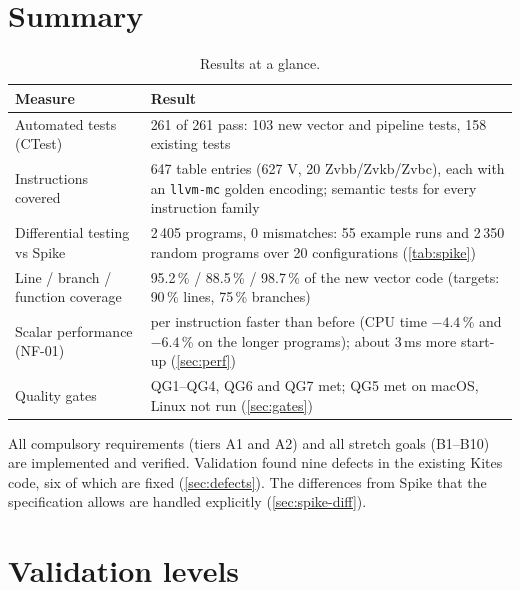 \documentclass[11pt]{article}
\begin{document}
\section{Summary}\label{sec:summary}

\begin{table}[H]
\centering\small
\caption{Results at a glance.}\label{tab:glance}
\begin{tabularx}{\textwidth}{@{}L{5.2cm}Y@{}}
\toprule
Measure & Result \\
\midrule
Automated tests (CTest) & 261 of 261 pass: 103 new vector and pipeline tests, 158 existing tests \\
Instructions covered & 647 table entries (627 V, 20 Zvbb/Zvkb/Zvbc), each with an \texttt{llvm-mc} golden encoding; semantic tests for every instruction family \\
Differential testing vs Spike & 2\,405 programs, 0 mismatches: 55 example runs and 2\,350 random programs over 20 configurations (\cref{tab:spike}) \\
Line / branch / function coverage & 95.2\,\% / 88.5\,\% / 98.7\,\% of the new vector code (targets: 90\,\% lines, 75\,\% branches) \\
Scalar performance (NF-01) & per instruction faster than before (CPU time $-4.4$\,\% and $-6.4$\,\% on the longer programs); about 3\,ms more start-up (\cref{sec:perf}) \\
Quality gates & QG1--QG4, QG6 and QG7 met; QG5 met on macOS, Linux not run (\cref{sec:gates}) \\
\bottomrule
\end{tabularx}
\end{table}

All compulsory requirements (tiers A1 and A2) and all stretch goals (B1--B10) are implemented
and verified. Validation found nine defects in the existing Kites code, six of which are fixed
(\cref{sec:defects}). The differences from Spike that the specification allows are handled
explicitly (\cref{sec:spike-diff}).

\section{Validation levels}\label{sec:levels}
\end{document}
